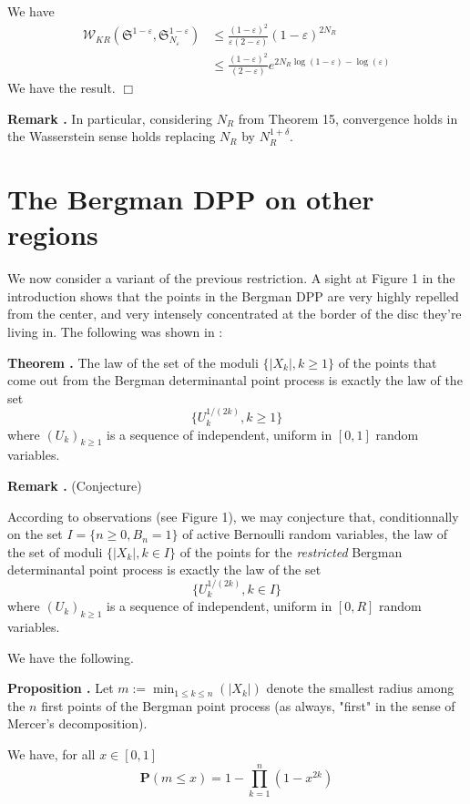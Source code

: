 \documentclass[11pt]{article}
\newcommand{\qed}{\hfill$\Box$}
\newcounter{cnt}
\newcommand{\cnt}{\thecnt \stepcounter{cnt}}
\begin{document}
We have
\begin{align*}
    \mathcal{W}_{KR}(\mathfrak{S}^{1-\varepsilon}, \mathfrak{S}_{N_\varepsilon }^{1-\varepsilon}) 
    &\leqslant \frac{(1-\varepsilon)^2}{\varepsilon(2-\varepsilon)} (1-\varepsilon)^{2 N_R} \\
    &\leqslant \frac{(1-\varepsilon)^2}{(2-\varepsilon)} e^{2 N_R \log(1-\varepsilon) - \log(\varepsilon)}
\end{align*}
We have the result. \qed

\textbf{Remark \cnt.} In particular, considering $N_R$ from Theorem 15, convergence holds in the Wasserstein sense holds replacing $ N_R$ by $ N_R^{1+\delta} $.

\section{The Bergman DPP on other regions}

We now consider a variant of the previous restriction. A sight at Figure 1 in the introduction shows that the points in the Bergman DPP are very highly repelled from the center, and very intensely concentrated at the border of the disc they're living in. The following was shown in \cite{ZerosGaussianPowerSeries} :

\textbf{Theorem \cnt.} The law of the set of the moduli $\{|X_k|, k \ge 1\}$ of the points that come out from the Bergman determinantal point process is exactly the law of the set
\[
\{U_k^{1/(2k)}, k \ge 1\}
\]
where $(U_k)_{k \ge 1}$ is a sequence of independent, uniform in $[0,1]$ random variables.

\textbf{Remark \cnt.} (Conjecture)

According to observations (see Figure 1), we may conjecture that, conditionnally on the set $I = \{n \ge 0, B_n = 1\}$ of active Bernoulli random variables, the law of the set of moduli $\{|X_k|, k \in I\}$ of the points for the \textit{restricted} Bergman determinantal point process is exactly the law of the set
\[
\{U_k^{1/(2k)}, k \in I\}
\]
where $(U_k)_{k \ge 1}$ is a sequence of independent, uniform in $[0, R]$ random variables.

We have the following.

\textbf{Proposition \cnt.} Let $m := \min_{1 \le k \le n} (|X_k|)$ denote the smallest radius among the $n$ first points of the Bergman point process (as always, "first" in the sense of Mercer's decomposition).

We have, for all $x \in [0,1]$
\[
\mathbf{P}(m \leqslant x) = 1 - \prod_{k=1}^n (1 - x^{2k})
\]
\end{document}

